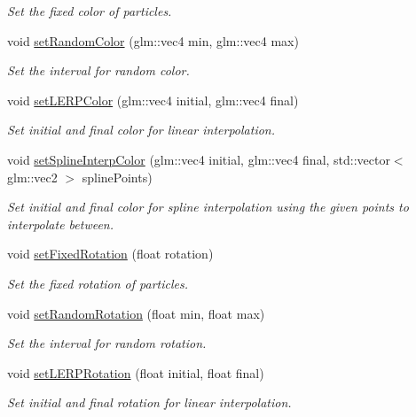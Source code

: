 \begin{DoxyCompactItemize}
\begin{DoxyCompactList}\small\item\em Set the fixed color of particles. \end{DoxyCompactList}\item 
void \hyperlink{struct_mason_1_1_particle_emitter_config_a5317af2f90691360678a2663a747c36d}{set\+Random\+Color} (glm\+::vec4 min, glm\+::vec4 max)
\begin{DoxyCompactList}\small\item\em Set the interval for random color. \end{DoxyCompactList}\item 
void \hyperlink{struct_mason_1_1_particle_emitter_config_a09620b4edcadd022cd8a447da17867a0}{set\+L\+E\+R\+P\+Color} (glm\+::vec4 initial, glm\+::vec4 final)
\begin{DoxyCompactList}\small\item\em Set initial and final color for linear interpolation. \end{DoxyCompactList}\item 
void \hyperlink{struct_mason_1_1_particle_emitter_config_aaf515319a62060a75edbb1e7b6403ff2}{set\+Spline\+Interp\+Color} (glm\+::vec4 initial, glm\+::vec4 final, std\+::vector$<$ glm\+::vec2 $>$ spline\+Points)
\begin{DoxyCompactList}\small\item\em Set initial and final color for spline interpolation using the given points to interpolate between. \end{DoxyCompactList}\item 
void \hyperlink{struct_mason_1_1_particle_emitter_config_acb790846d2a00fd97160fdac66589fd5}{set\+Fixed\+Rotation} (float rotation)
\begin{DoxyCompactList}\small\item\em Set the fixed rotation of particles. \end{DoxyCompactList}\item 
void \hyperlink{struct_mason_1_1_particle_emitter_config_a463adb67fe4ee1732daa20e9d01d2331}{set\+Random\+Rotation} (float min, float max)
\begin{DoxyCompactList}\small\item\em Set the interval for random rotation. \end{DoxyCompactList}\item 
void \hyperlink{struct_mason_1_1_particle_emitter_config_ad96c857c3ceac520462a10981e471c4b}{set\+L\+E\+R\+P\+Rotation} (float initial, float final)
\begin{DoxyCompactList}\small\item\em Set initial and final rotation for linear interpolation. \end{DoxyCompactList}\item 

\end{DoxyCompactItemize}

